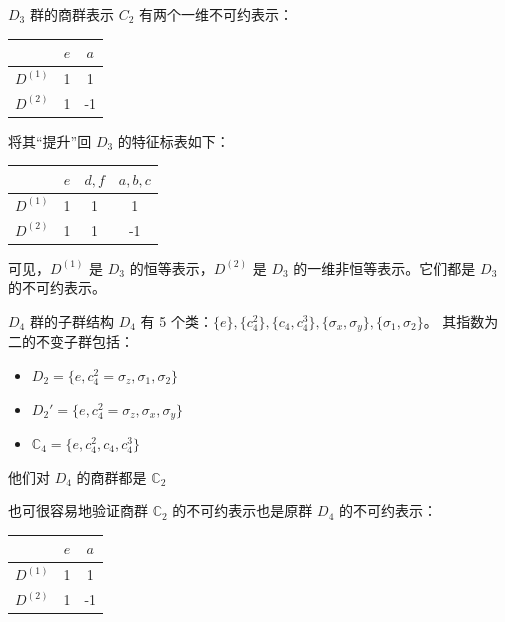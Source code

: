 \begin{enumerate}
\begin{example}{$D_3$ 群的商群表示}
        $C_2$ 有两个一维不可约表示：
        \begin{center}
        \begin{tabular}{c|cc}
             & $e$ &  $a$ \\
            \hline
            $D^{(1)}$ & 1  & 1 \\
            $D^{(2)}$ & 1  & -1 \\
        \end{tabular}
        \end{center}
        
        将其“提升”回 $D_3$ 的特征标表如下：
        
        \begin{center}
        \begin{tabular}{c|ccc}
             & $e$ & $d, f$ & $a, b, c$ \\
            \hline
            $D^{(1)}$ & 1 & 1 & 1 \\
            $D^{(2)}$ & 1 & 1 & -1 \\
        \end{tabular}
        \end{center}
        
        可见，$D^{(1)}$ 是 $D_3$ 的恒等表示，$D^{(2)}$ 是 $D_3$ 的一维非恒等表示。它们都是 $D_3$ 的不可约表示。
    \end{example}

    \begin{example}{$D_4$ 群的子群结构}
        $D_4$ 有 5 个类：$\{e\}, \{c_4^2\}, \{c_4, c_4^3\}, \{\sigma_x, \sigma_y\}, \{\sigma_1, \sigma_2\}$。
        其指数为二的不变子群包括：
        \begin{itemize}
            \item $D_2 = \{e, c_4^2=\sigma_z, \sigma_1, \sigma_2\}$
            \item $D_2' = \{e, c_4^2=\sigma_z, \sigma_x, \sigma_y\}$
            \item $\mathbb{C}_{4}= \{e, c_4^2,c_4, c_4^3\}$
        \end{itemize}
    \end{example}
    他们对 $D_4$   的商群都是 $\mathbb{C}_{2}$

    也可很容易地验证商群 $\mathbb{C}_{2}$ 的不可约表示也是原群 $D_4$ 的不可约表示：

\begin{center}
        \begin{tabular}{c|cc}
             & $e$ &  $a$ \\
            \hline
            $D^{(1)}$ & 1  & 1 \\
            $D^{(2)}$ & 1  & -1 \\
        \end{tabular}
        \end{center}


\end{enumerate}
